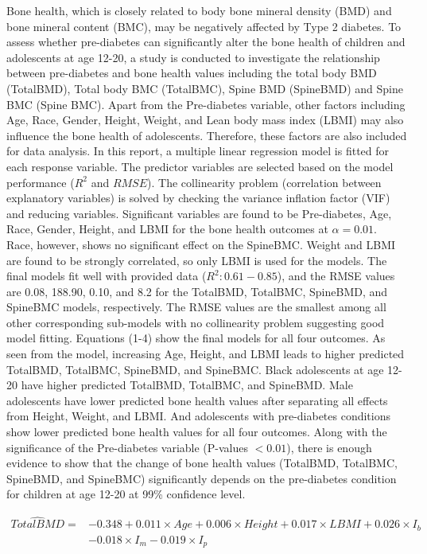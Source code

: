 \documentclass[11pt]{article}
\begin{document}
Bone health, which is closely related to body bone mineral density (BMD) and bone mineral content (BMC), may be negatively affected by Type 2 diabetes. To assess whether pre-diabetes can significantly alter the bone health of children and adolescents at age 12-20, a study is conducted to investigate the relationship between pre-diabetes and bone health values including the total body BMD (TotalBMD), Total body BMC (TotalBMC), Spine BMD (SpineBMD) and Spine BMC (Spine BMC). Apart from the Pre-diabetes variable, other factors including Age, Race, Gender, Height, Weight, and Lean body mass index (LBMI) may also influence the bone health of adolescents. Therefore, these factors are also included for data analysis. In this report, a multiple linear regression model is fitted for each response variable. The predictor variables are selected based on the model performance ($R^2$ and $RMSE$). The collinearity problem (correlation between explanatory variables) is solved by checking the variance inflation factor (VIF) and reducing variables. Significant variables are found to be Pre-diabetes, Age, Race, Gender, Height, and LBMI for the bone health outcomes at $\alpha=0.01$. Race, however, shows no significant effect on the SpineBMC. Weight and LBMI are found to be strongly correlated, so only LBMI is used for the models. The final models fit well with provided data ($R^2: 0.61-0.85$), and the RMSE values are 0.08, 188.90, 0.10, and 8.2 for the TotalBMD, TotalBMC, SpineBMD, and SpineBMC models, respectively. The RMSE values are the smallest among all other corresponding sub-models with no collinearity problem suggesting good model fitting. Equations (1-4) show the final models for all four outcomes. As seen from the model, increasing Age, Height, and LBMI leads to higher predicted TotalBMD, TotalBMC, SpineBMD, and SpineBMC. Black adolescents at age 12-20 have higher predicted TotalBMD, TotalBMC, and SpineBMD. Male adolescents have lower predicted bone health values after separating all effects from Height, Weight, and LBMI. And adolescents with pre-diabetes conditions show lower predicted bone health values for all four outcomes. Along with the significance of the Pre-diabetes variable (P-values $<0.01$), there is enough evidence to show that the change of bone health values (TotalBMD, TotalBMC, SpineBMD, and SpineBMC) significantly depends on the pre-diabetes condition for children at age 12-20 at 99\% confidence level. 

\begin{equation}
\begin{split}
\hat{TotalBMD} = &-0.348 +0.011\times Age +0.006\times Height +0.017\times LBMI + 0.026\times I_b\\
&  -0.018\times I_m -0.019\times I_p\\
\end{split}
\end{equation}
\end{document}
